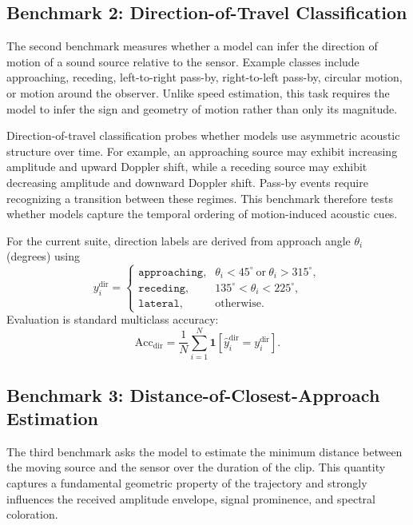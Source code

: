 \documentclass{article}
\begin{document}
\subsection{Benchmark 2: Direction-of-Travel Classification}

The second benchmark measures whether a model can infer the direction of motion of a sound source relative to the sensor. Example classes include approaching, receding, left-to-right pass-by, right-to-left pass-by, circular motion, or motion around the observer. Unlike speed estimation, this task requires the model to infer the sign and geometry of motion rather than only its magnitude.

Direction-of-travel classification probes whether models use asymmetric acoustic structure over time. For example, an approaching source may exhibit increasing amplitude and upward Doppler shift, while a receding source may exhibit decreasing amplitude and downward Doppler shift. Pass-by events require recognizing a transition between these regimes. This benchmark therefore tests whether models capture the temporal ordering of motion-induced acoustic cues.

For the current suite, direction labels are derived from approach angle \(\theta_i\) (degrees) using
\begin{equation}
  y_i^{\text{dir}}=
  \begin{cases}
    \texttt{approaching}, & \theta_i<45^\circ \ \text{or}\ \theta_i>315^\circ,\\
    \texttt{receding}, & 135^\circ<\theta_i<225^\circ,\\
    \texttt{lateral}, & \text{otherwise}.
  \end{cases}
\end{equation}
Evaluation is standard multiclass accuracy:
\begin{equation}
  \mathrm{Acc}_{\text{dir}}=\frac{1}{N}\sum_{i=1}^{N}\mathbf{1}\!\left[\hat y_i^{\text{dir}}=y_i^{\text{dir}}\right].
\end{equation}

\subsection{Benchmark 3: Distance-of-Closest-Approach Estimation}

The third benchmark asks the model to estimate the minimum distance between the moving source and the sensor over the duration of the clip. This quantity captures a fundamental geometric property of the trajectory and strongly influences the received amplitude envelope, signal prominence, and spectral coloration.
\end{document}

